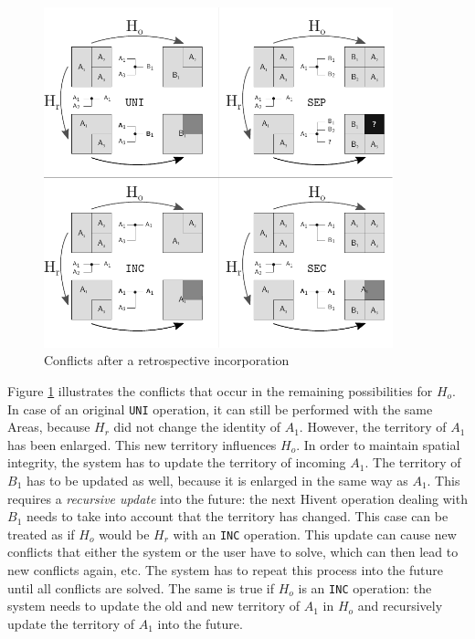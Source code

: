 \begin{figure}[ht]
\vspace{1em}
  \centering
  \includegraphics[width=0.9\textwidth]{graphics/development/editing_hivent_data/retrospective_updates/INC}
  \caption{Conflicts after a retrospective incorporation}
  \label{fig:update_conflict_INC}
\end{figure}

Figure \ref{fig:update_conflict_INC} illustrates the conflicts that occur in the remaining possibilities for $H_o$. In case of an original \texttt{UNI} operation, it can still be performed with the same Areas, because $H_r$ did not change the identity of $A_1$. However, the territory of $A_1$ has been enlarged. This new territory influences $H_o$. In order to maintain spatial integrity, the system has to update the territory of incoming $A_1$. The territory of $B_1$ has to be updated as well, because it is enlarged in the same way as $A_1$. This requires a \emph{recursive update} into the future: the next Hivent operation dealing with $B_1$ needs to take into account that the territory has changed. This case can be treated as if $H_o$ would be $H_r$ with an \texttt{INC} operation. This update can cause new conflicts that either the system or the user have to solve, which can then lead to new conflicts again, etc. The system has to repeat this process into the future until all conflicts are solved. The same is true if $H_o$ is an \texttt{INC} operation: the system needs to update the old and new territory of $A_1$ in $H_o$ and recursively update the territory of $A_1$ into the future.

